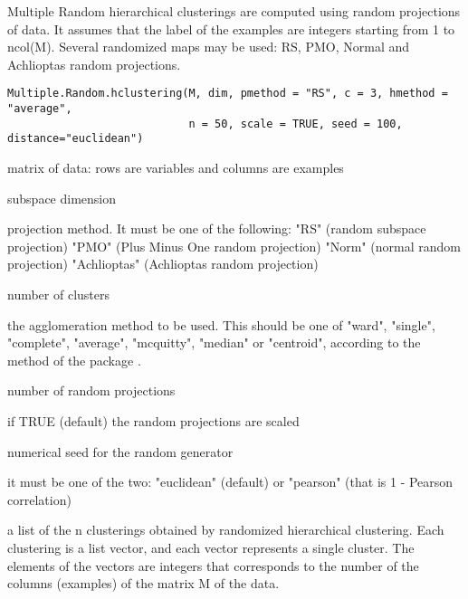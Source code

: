 \documentclass{article}
\begin{document}
\begin{Description}\relax
Multiple Random hierarchical clusterings are computed using random projections of data.
It assumes that the label of the examples are integers starting from 1 to ncol(M).
Several randomized maps may be used: RS, PMO, Normal and Achlioptas random projections.
\end{Description}
\begin{Usage}
\begin{verbatim}
Multiple.Random.hclustering(M, dim, pmethod = "RS", c = 3, hmethod = "average", 
                            n = 50, scale = TRUE, seed = 100, distance="euclidean")
\end{verbatim}
\end{Usage}
\begin{Arguments}
\begin{ldescription}
\item[\code{M}] matrix of data: rows are variables and columns are examples 
\item[\code{dim}] subspace dimension 
\item[\code{pmethod}] projection method. It must be one of the following: 
"RS" (random subspace projection)
"PMO" (Plus Minus One random projection)
"Norm" (normal random projection)
"Achlioptas" (Achlioptas random projection) 
\item[\code{c}] number of clusters 
\item[\code{hmethod}] the agglomeration method to be used. This should be one of 
"ward", "single", "complete", "average", "mcquitty", "median" or "centroid", 
according to the 
method of the package . 
\item[\code{n}] number of  random projections 
\item[\code{scale}] if TRUE (default) the random projections are scaled 
\item[\code{seed}] numerical seed for the random generator 
\item[\code{distance}] it must be one of the two: "euclidean" (default) or "pearson" (that is 1 - Pearson correlation) 
\end{ldescription}
\end{Arguments}
\begin{Value}
a list  of the n clusterings obtained by randomized hierarchical clustering. Each clustering is a list vector,
and each vector represents a single cluster. The elements of the vectors are integers that corresponds to the number
of the columns (examples) of the matrix M of the data.
\end{Value}
\end{document}
